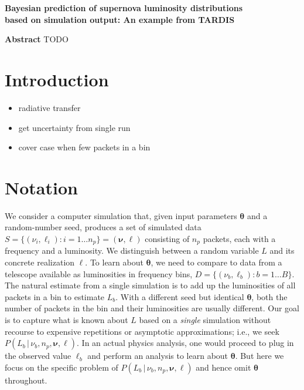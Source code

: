 \documentclass[11pt]{article}
\newcommand{\cond}{\,|\,}
\newcommand{\bml}{{\bm{\ell}}}
\newcommand{\bmnu}{{\bm{\nu}}}
\newcommand{\bmtheta}{{\bm{\theta}}}
\newcommand{\npack}{n_p}
\newcommand{\tardis}{TARDIS}
\begin{document}
\begin{center}
  \textbf{\Large Bayesian prediction of supernova luminosity  distributions}\\[8pt]
  \textbf{\Large based on simulation output: An example from \tardis}\\[12pt]
\end{center}

\textbf{Abstract} TODO\\

\section{Introduction} \label{sec:intro}

\begin{itemize}
  \item radiative transfer
  \item get uncertainty from single run
  \item cover case when few packets in a bin
\end{itemize}

\section{Notation} \label{sec:notation}

We consider a computer simulation that, given input parameters
$\bmtheta$ and a random-number seed, produces a set of simulated data
$ S = \{ (\nu_i, \ell_i): i=1\dots\npack \} = (\bmnu, \bml)$
consisting of $\npack$ packets, each with a frequency and a
luminosity. We distinguish between a random variable $L$ and its
concrete realization $\ell$.  To learn about $\bmtheta$, we need to
compare to data from a telescope available as luminosities in
frequency bins, $D = \{ ( \nu_b, \ell_b): b=1 \dots B\}$. The natural
estimate from a single simulation is to add up the luminosities of all
packets in a bin to estimate $L_b$.  With a different seed but
identical $\bmtheta$, both the number of packets in the bin and their
luminosities are usually different. Our goal is to capture what is
known about $L$ based on a \emph{single} simulation without recourse
to expensive repetitions or asymptotic approximations; i.e., we seek
$P(L_b \cond \nu_b, \npack, \bmnu, \bml )$. In an actual physics
analysis, one would proceed to plug in the observed value $\ell_b$ and
perform an analysis to learn about $\bmtheta$. But here we focus on
the specific problem of $P(L_b \cond \nu_b, \npack, \bmnu, \bml )$ and
hence omit $\bmtheta$ throughout.
\end{document}
